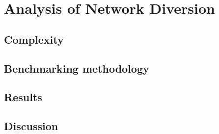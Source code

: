 \chapter{Analysis of Network Diversion}

\section{Complexity}

\section{Benchmarking methodology}

\section{Results}

\section{Discussion}
